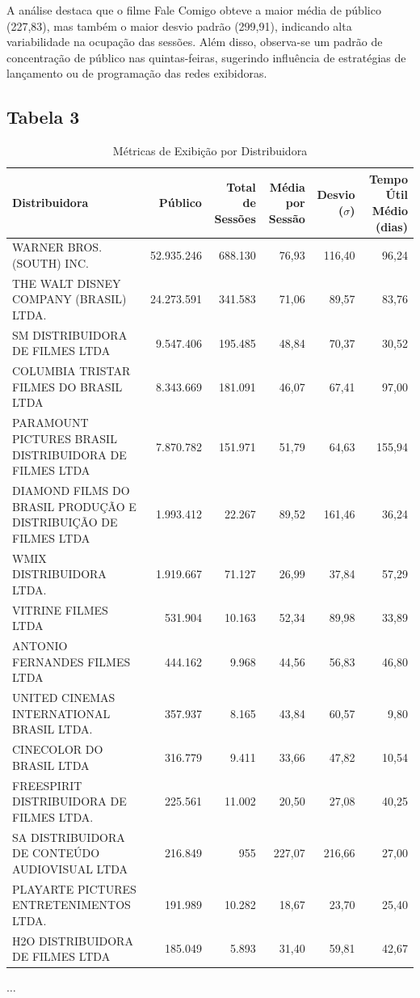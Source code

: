 \documentclass{article}
\begin{document}
A análise destaca que o filme Fale Comigo obteve a maior média de público (227,83), mas também o maior desvio padrão (299,91), indicando alta variabilidade na ocupação das sessões. Além disso, observa-se um padrão de concentração de público nas quintas-feiras, sugerindo influência de estratégias de lançamento ou de programação das redes exibidoras.


\begin{landscape}
\subsection*{Tabela 3}
\begin{table}[H]
\centering
\small
\caption{Métricas de Exibição por Distribuidora\\}
\begin{tabular}{p{5cm}rrrrr}
\hline
\textbf{Distribuidora} & \textbf{Público} & \textbf{Total de Sessões} & \textbf{Média por Sessão} & \textbf{Desvio ($\sigma$)} & \textbf{Tempo Útil Médio (dias)} \\
\hline
WARNER BROS. (SOUTH) INC. & 52.935.246 & 688.130 & 76,93 & 116,40 & 96,24 \\
THE WALT DISNEY COMPANY (BRASIL) LTDA. & 24.273.591 & 341.583 & 71,06 & 89,57 & 83,76 \\
SM DISTRIBUIDORA DE FILMES LTDA & 9.547.406 & 195.485 & 48,84 & 70,37 & 30,52 \\
COLUMBIA TRISTAR FILMES DO BRASIL LTDA & 8.343.669 & 181.091 & 46,07 & 67,41 & 97,00 \\
PARAMOUNT PICTURES BRASIL DISTRIBUIDORA DE FILMES LTDA & 7.870.782 & 151.971 & 51,79 & 64,63 & 155,94 \\
DIAMOND FILMS DO BRASIL PRODUÇÃO E DISTRIBUIÇÃO DE FILMES LTDA & 1.993.412 & 22.267 & 89,52 & 161,46 & 36,24 \\
WMIX DISTRIBUIDORA LTDA. & 1.919.667 & 71.127 & 26,99 & 37,84 & 57,29 \\
VITRINE FILMES LTDA & 531.904 & 10.163 & 52,34 & 89,98 & 33,89 \\
ANTONIO FERNANDES FILMES LTDA & 444.162 & 9.968 & 44,56 & 56,83 & 46,80 \\
UNITED CINEMAS INTERNATIONAL BRASIL LTDA. & 357.937 & 8.165 & 43,84 & 60,57 & 9,80 \\
CINECOLOR DO BRASIL LTDA & 316.779 & 9.411 & 33,66 & 47,82 & 10,54 \\
FREESPIRIT DISTRIBUIDORA DE FILMES LTDA. & 225.561 & 11.002 & 20,50 & 27,08 & 40,25 \\
SA DISTRIBUIDORA DE CONTEÚDO AUDIOVISUAL LTDA & 216.849 & 955 & 227,07 & 216,66 & 27,00 \\
PLAYARTE PICTURES ENTRETENIMENTOS LTDA. & 191.989 & 10.282 & 18,67 & 23,70 & 25,40 \\
H2O DISTRIBUIDORA DE FILMES LTDA & 185.049 & 5.893 & 31,40 & 59,81 & 42,67 \\





\end{tabular}
\begin{center}
$\ldots$
\end{center}
\end{table}
\end{landscape}
\end{document}

